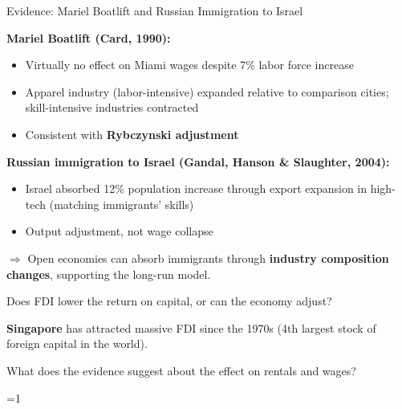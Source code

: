 \documentclass{beamer}
\newcommand{\showanswers}{1}  %
\begin{document}
\begin{frame}{Evidence: Mariel Boatlift and Russian Immigration to Israel}

\textbf{Mariel Boatlift (Card, 1990):}
\begin{itemize}
    \item Virtually no effect on Miami wages despite 7\% labor force increase
    \item Apparel industry (labor-intensive) expanded relative to comparison cities; skill-intensive industries contracted
    \item Consistent with \textbf{Rybczynski adjustment}
\end{itemize}

\vspace{0.3cm}

\textbf{Russian immigration to Israel (Gandal, Hanson \& Slaughter, 2004):}
\begin{itemize}
    \item Israel absorbed 12\% population increase through export expansion in high-tech (matching immigrants' skills)
    \item Output adjustment, not wage collapse
\end{itemize}

\vspace{0.3cm}

$\Rightarrow$ Open economies can absorb immigrants through \textbf{industry composition changes}, supporting the long-run model.

\end{frame}

\fi



\begin{frame}{Does FDI lower the return on capital, or can the economy adjust?}

\textbf{Singapore} has attracted massive FDI since the 1970s (4th largest stock of foreign capital in the world).

\vspace{0.3cm}

What does the evidence suggest about the effect on rentals and wages?

\end{frame}



\ifnum\showanswers=1
\end{document}
